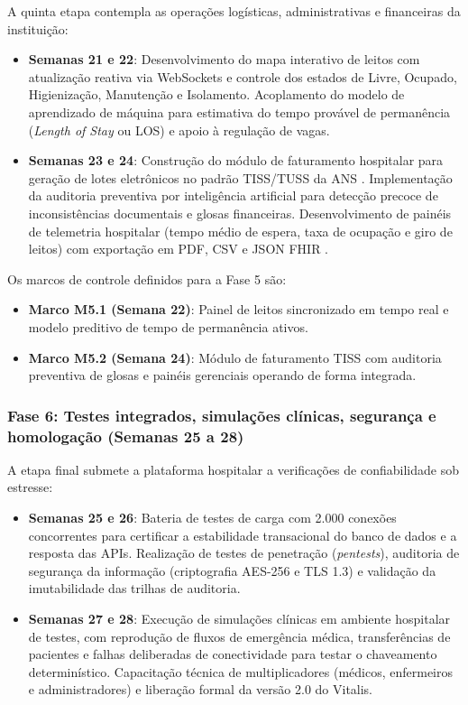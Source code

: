 A quinta etapa contempla as operações logísticas, administrativas e financeiras da instituição:
\begin{itemize}[leftmargin=*]
    \item \textbf{Semanas 21 e 22}: Desenvolvimento do mapa interativo de leitos com atualização reativa via WebSockets e controle dos estados de Livre, Ocupado, Higienização, Manutenção e Isolamento. Acoplamento do modelo de aprendizado de máquina para estimativa do tempo provável de permanência (\textit{Length of Stay} ou LOS) e apoio à regulação de vagas.
    \item \textbf{Semanas 23 e 24}: Construção do módulo de faturamento hospitalar para geração de lotes eletrônicos no padrão TISS/TUSS da ANS \cite{ans_tiss:2023}. Implementação da auditoria preventiva por inteligência artificial para detecção precoce de inconsistências documentais e glosas financeiras. Desenvolvimento de painéis de telemetria hospitalar (tempo médio de espera, taxa de ocupação e giro de leitos) com exportação em PDF, CSV e JSON FHIR \cite{hl7_fhir:2019}.
\end{itemize}

Os marcos de controle definidos para a Fase 5 são:
\begin{itemize}[leftmargin=*]
    \item \textbf{Marco M5.1 (Semana 22)}: Painel de leitos sincronizado em tempo real e modelo preditivo de tempo de permanência ativos.
    \item \textbf{Marco M5.2 (Semana 24)}: Módulo de faturamento TISS com auditoria preventiva de glosas e painéis gerenciais operando de forma integrada.
\end{itemize}

\subsubsection{Fase 6: Testes integrados, simulações clínicas, segurança e homologação (Semanas 25 a 28)}

A etapa final submete a plataforma hospitalar a verificações de confiabilidade sob estresse:
\begin{itemize}[leftmargin=*]
    \item \textbf{Semanas 25 e 26}: Bateria de testes de carga com 2.000 conexões concorrentes para certificar a estabilidade transacional do banco de dados e a resposta das APIs. Realização de testes de penetração (\textit{pentests}), auditoria de segurança da informação (criptografia AES-256 e TLS 1.3) e validação da imutabilidade das trilhas de auditoria.
    \item \textbf{Semanas 27 e 28}: Execução de simulações clínicas em ambiente hospitalar de testes, com reprodução de fluxos de emergência médica, transferências de pacientes e falhas deliberadas de conectividade para testar o chaveamento determinístico. Capacitação técnica de multiplicadores (médicos, enfermeiros e administradores) e liberação formal da versão 2.0 do Vitalis.
\end{itemize}

